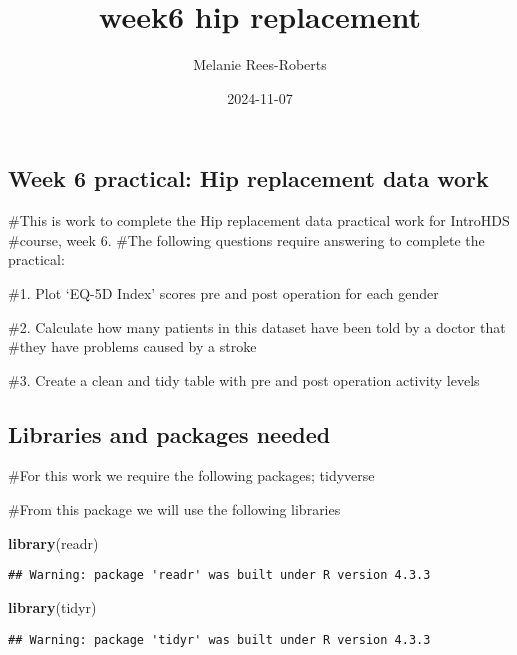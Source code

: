 \documentclass[
]{article}
\title{week6 hip replacement}
\author{Melanie Rees-Roberts}
\date{2024-11-07}
\newenvironment{Shaded}{\begin{snugshade}}{\end{snugshade}}
\newcommand{\FunctionTok}[1]{\textcolor[rgb]{0.13,0.29,0.53}{\textbf{#1}}}
\newcommand{\NormalTok}[1]{#1}
\begin{document}
\maketitle

\subsection{Week 6 practical: Hip replacement data
work}\label{week-6-practical-hip-replacement-data-work}

\#This is work to complete the Hip replacement data practical work for
IntroHDS \#course, week 6. \#The following questions require answering
to complete the practical:

\#1. Plot `EQ-5D Index' scores pre and post operation for each gender

\#2. Calculate how many patients in this dataset have been told by a
doctor that \#they have problems caused by a stroke

\#3. Create a clean and tidy table with pre and post operation activity
levels

\subsection{Libraries and packages
needed}\label{libraries-and-packages-needed}

\#For this work we require the following packages; tidyverse

\#From this package we will use the following libraries

\begin{Shaded}
\begin{Highlighting}[]
\FunctionTok{library}\NormalTok{(readr)}
\end{Highlighting}
\end{Shaded}

\begin{verbatim}
## Warning: package 'readr' was built under R version 4.3.3
\end{verbatim}

\begin{Shaded}
\begin{Highlighting}[]
\FunctionTok{library}\NormalTok{(tidyr)}
\end{Highlighting}
\end{Shaded}

\begin{verbatim}
## Warning: package 'tidyr' was built under R version 4.3.3
\end{verbatim}
\end{document}
